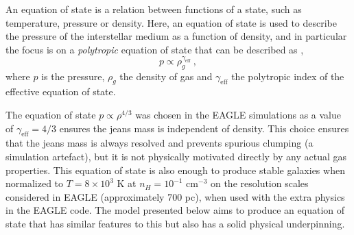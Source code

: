 An equation of state is a relation between functions of a state, such as temperature, pressure or density. 
Here, an equation of state is used to describe the pressure of the interstellar medium as a function of density, and in particular the focus is on a \emph{polytropic} equation of state that can be described as \citep{horedt_polytropes:_2004},
\begin{equation}
\label{eqn:polytrope}
p \propto \rho_g ^ {\gamma_\mathrm{eff}}~,
\end{equation}
where $p$ is the pressure, $\rho_g$ the density of gas and $\gamma_\mathrm{eff}$ the polytropic index of the effective equation of state.

The equation of state $p \propto \rho^{4/3}$ was chosen in the EAGLE simulations \citep{schaye_eagle_2015} as a value of $\gamma_\mathrm{eff} = 4/3$ ensures the jeans mass is independent of density.
This choice ensures that the jeans mass is always resolved and prevents spurious clumping (a simulation artefact), but it is not physically motivated directly by any actual gas properties.
This equation of state is also enough to produce stable galaxies when normalized to $T = 8\times 10^3$ K at $n_H = 10^{-1}$ cm$^{-3}$ on the resolution scales considered in EAGLE (approximately 700 pc), when used with the extra physics in the EAGLE code.
The model presented below aims to produce an equation of state that has similar features to this but also has a solid physical underpinning.

